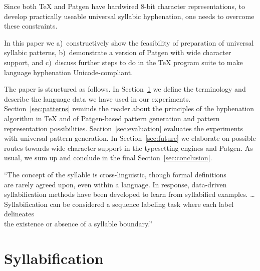 \documentclass{csbulletin}
\let\program=\textrm %
\newcommand{\Patgen}{\program{Patgen}\xspace}
\newcommand\motto[3]{\vspace{#1\baselineskip}\pagebreak[3]
\begin{flushright}\small#3
\end{flushright}%
\vspace*{#2\baselineskip}%
}
\begin{document}
Since both {\TeX} and %
\Patgen{} have hardwired \mbox{8-bit} character representations,
to develop practically useable universal syllabic hyphenation, one needs to overcome these constraints.



In this paper we 
\textrm{a)}~constructively show the feasibility of preparation of universal syllabic patterns, 
\textrm{b)}~demonstrate a version of \Patgen{} with wide character support, and 
\textrm{c)}~discuss further steps to do in the \TeX{} program suite to make language hyphenation Unicode-compliant.

The paper is structured as follows.
%
In Section~\ref{sec:2} we define the terminology and describe the language data we have used in our experiments.
%
Section~\ref{sec:patterns} reminds the reader about the principles of the hyphenation algorithm in \TeX{} and of \Patgen-based pattern generation and pattern representation possibilities.
%
Section~\ref{sec:evaluation} evaluates the experiments with universal pattern generation.
%
In Section~\ref{sec:future} we elaborate on possible routes towards wide character support in the typesetting engines and \Patgen. 
%
As usual, we sum up and conclude in the final Section~\ref{sec:conclusion}.



\motto{1}{-2}{``The concept of the syllable is cross-linguistic, though formal definitions\\ are rarely agreed upon, even within a language.
In response, data-driven\\ syllabification methods have been developed to learn from syllabified examples. \ldots\\
Syllabification can be considered a sequence labeling task where each label delineates\\ the existence or absence of a syllable boundary.''~\cite{nlp:Krantz2019}}

\section{Syllabification}
\label{sec:2}
\end{document}
